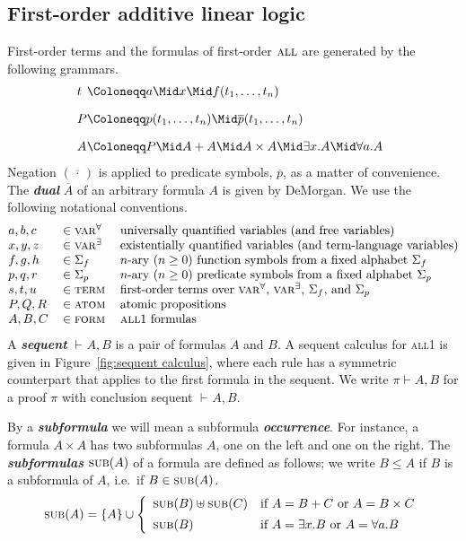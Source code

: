 \documentclass[UKenglish]{lipics-v2016}
\theoremstyle{plain}
\newcommand\defn[1]{\textit{\textbf{#1}}}
\newcommand\varA{\textsc{var}^\forall}
\newcommand\varE{\textsc{var}^\exists}
\newcommand\terms{\textsc{term}}
\newcommand\atom{\textsc{atom}}
\newcommand\form{\textsc{form}}
\newcommand\all{\textsc{all}}
\newcommand\subs[1]{\textsc{sub}(#1)}
\newcommand\+{+}
\renewcommand\*{\times}
\newcommand\dual[1]{\overline{#1}}
\newcommand\sub{\leq}
\newcommand\seq[3][]{{\vdash_{#1}}#2,#3}
\newcommand\prf[3]{#1\vdash\!#2,#3}
\begin{document}


\subsection{First-order additive linear logic}

First-order terms and the formulas of first-order $\all$ are generated by the following grammars.
%
\setMidspace{5pt}
\[
\begin{array}{@{}l@{}l}
	t &\Coloneqq a \Mid x \Mid f(t_1,\dots,t_n)
\\[10pt]
	P &\Coloneqq p(t_1,\dots,t_n) \Mid \dual p(t_1,\dots,t_n)
\\[10pt]
	A &\Coloneqq P \Mid A\+A \Mid A\*A \Mid \exists x.A \Mid \forall a.A
\end{array}
\]
%
Negation $(\dual{\,\cdot\,})$ is applied to predicate symbols, $\dual p$, as a matter of convenience. The \defn{dual} $\dual A$ of an arbitrary formula $A$ is given by DeMorgan. We use the following notational conventions.
%
\[
\begin{tabular}{@{}lll@{}}
	$a,b,c$ & $\in \varA$ 		& universally quantified variables (and free variables)\\
	$x,y,z$ & $\in \varE$		& existentially quantified variables (and term-language variables)\\
	$f,g,h$ & $\in \Sigma_f$	& $n$-ary $(n\geq 0)$ function symbols from a fixed alphabet $\Sigma_f$\\
	$p,q,r$ & $\in \Sigma_p$	& $n$-ary $(n\geq 0)$ predicate symbols from a fixed alphabet $\Sigma_p$ \\
	$s,t,u$ & $\in \terms$ 		& first-order terms over $\varA$, $\varE$, $\Sigma_f$, and $\Sigma_p$ \\
	$P,Q,R$ & $\in \atom$		& atomic propositions \\
	$A,B,C$ & $\in \form$		& \all1 formulas \\
\end{tabular}
\]
%
A \defn{sequent} $\seq AB$ is a pair of formulas $A$ and $B$. A sequent calculus for \all1 is given in Figure~\ref{fig:sequent calculus}, where each rule has a symmetric counterpart that applies to the first formula in the sequent. We write $\prf\pi AB$ for a proof $\pi$ with conclusion sequent $\seq AB$.

By a \defn{subformula} we will mean a subformula \defn{occurrence}. For instance, a formula $A\*A$ has two subformulas $A$, one on the left and one on the right. The \defn{subformulas} $\subs A$ of a formula are defined as follows; we write $B\sub A$ if $B$ is a subformula of $A$, i.e.\ if $B\in\subs A$.
\[
	\subs A = \{A\} \cup
	\left\{\begin{array}{ll}
		\subs B\uplus\subs C	& \text{if $A=B\+C$ or $A=B\*C$} \\[5pt]
		\subs B					& \text{if $A=\exists x.B$ or $A=\forall a.B$}
	\end{array}\right.
\]
\end{document}
